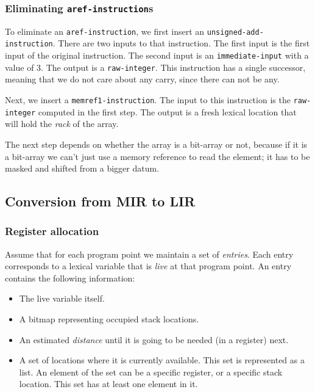 \subsubsection{Eliminating \texttt{aref-instruction}s}

To eliminate an \texttt{aref-instruction}, we first insert an
\texttt{unsigned-add-instruction}.  There are two inputs to that
instruction.  The first input is the first input of the original
instruction.  The second input is an \texttt{immediate-input} with a
value of 3.  The output is a \texttt{raw-integer}.  This instruction
has a single successor, meaning that we do not care about any carry,
since there can not be any.

Next, we insert a \texttt{memref1-instruction}.  The input to this
instruction is the \texttt{raw-integer} computed in the first step.
The output is a fresh lexical location that will hold the \emph{rack}
of the array.

The next step depends on whether the array is a bit-array or not,
because if it is a bit-array we can't just use a memory reference to
read the element; it has to be masked and shifted from a bigger
datum.

\subsection{Conversion from MIR to LIR}

\subsubsection{Register allocation}

Assume that for each program point we maintain a set of
\emph{entries}.  Each entry corresponds to a lexical variable that is
\emph{live} at that program point.  An entry contains the following
information:

\begin{itemize}
\item The live variable itself.
\item A bitmap representing occupied stack locations.
\item An estimated \emph{distance} until it is going to be needed (in
  a register) next.
\item A set of locations where it is currently available.  This set is
  represented as a list.  An element of the set can be a specific
  register, or a specific stack location.  This set has at least one
  element in it.
\end{itemize}

